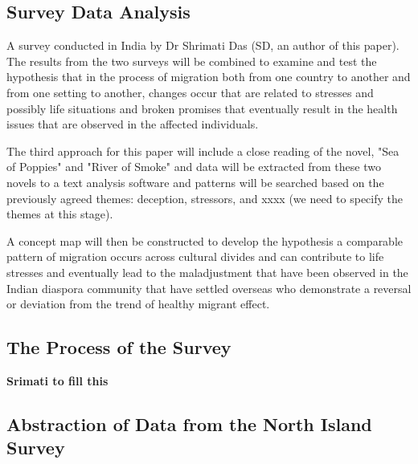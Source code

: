 \subsection*{Survey Data Analysis}
A survey conducted in India by Dr Shrimati Das (SD, an author of this paper). The results from the two surveys will be combined to examine and test the hypothesis that in the process of migration both from one country to another and from one setting to another, changes occur that are related to stresses and possibly life situations and broken promises that eventually result in the health issues that are observed in the affected individuals.

The third approach for this paper will include a close reading of the novel, "Sea of Poppies" and "River of Smoke" and data will be extracted from these two novels to a text analysis software and patterns will be searched based on the previously agreed themes: deception, stressors, and xxxx (we need to specify the themes at this stage).

A concept map will then be constructed to develop the hypothesis a comparable pattern of migration occurs across cultural divides and can contribute to life stresses and eventually lead to the maladjustment that have been observed in the Indian diaspora community that have settled overseas who demonstrate a reversal or deviation from the trend of healthy migrant effect. 

\subsection{The Process of the Survey}
\textbf{Srimati to fill this}

\subsection{Abstraction of Data from the North Island Survey}



    